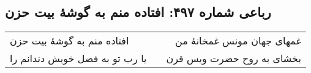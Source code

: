\begin{center}
\section*{رباعی شماره ۴۹۷: افتاده منم به گوشهٔ بیت حزن}
\label{sec:sh497}
\begin{longtable}{l p{0.5cm} r}
افتاده منم به گوشهٔ بیت حزن
&&
غمهای جهان مونس غمخانهٔ من
\\
یا رب تو به فضل خویش دندانم را
&&
بخشای به روح حضرت ویس قرن
\\
\end{longtable}
\end{center}
